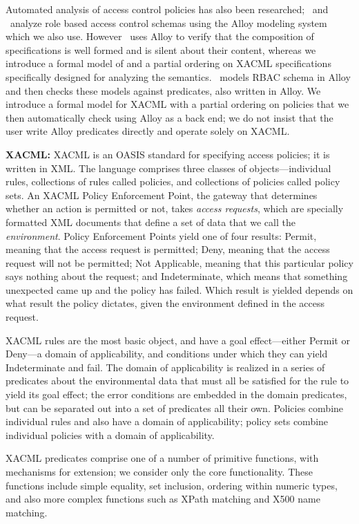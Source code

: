 Automated analysis of access control policies has also been
researched; \cite{schaad:lightweight}~and \cite{zao:rbac}~analyze role
based access control schemas using the Alloy modeling system which we
also use.  However \cite{schaad:lightweight}~uses Alloy to verify that
the composition of specifications is well formed and is silent about
their content, whereas we introduce a formal model of and a partial
ordering on XACML specifications specifically designed for analyzing
the semantics.  \cite{zao:rbac}~models RBAC schema in Alloy and then
checks these models against predicates, also written in Alloy.  We
introduce a formal model for XACML with a partial ordering on policies
that we then automatically check using Alloy as a back end; we do not
insist that the user write Alloy predicates directly and operate
solely on XACML.

{\bf XACML:}
XACML is an OASIS standard for specifying access policies; it is
written in XML.  The language comprises three classes of
objects---individual rules, collections of rules called policies, and
collections of policies called policy sets.  An XACML Policy
Enforcement Point, the gateway that determines whether an action is
permitted or not, takes \emph{access requests}, which are specially
formatted XML documents that define a set of data that we call the
\emph{environment}.  Policy Enforcement Points yield one of four
results: Permit, meaning that the access request is permitted; Deny,
meaning that the access request will not be permitted; Not Applicable,
meaning that this particular policy says nothing about the request;
and Indeterminate, which means that something unexpected came up and
the policy has failed.  Which result is yielded depends on what result
the policy dictates, given the environment defined in the access
request.

XACML rules are the most basic object, and have a goal effect---either
Permit or Deny---a domain of applicability, and conditions under which
they can yield Indeterminate and fail.  The domain of applicability is
realized in a series of predicates about the environmental data that
must all be satisfied for the rule to yield its goal effect; the error
conditions are embedded in the domain predicates, but can be separated
out into a set of predicates all their own.  Policies combine
individual rules and also have a domain of applicability; policy sets
combine individual policies with a domain of applicability.

XACML predicates comprise one of a number of primitive functions, with
mechanisms for extension; we consider only the core functionality.
These functions include simple equality, set inclusion, ordering
within numeric types, and also more complex functions such as XPath
matching and X500 name matching.



